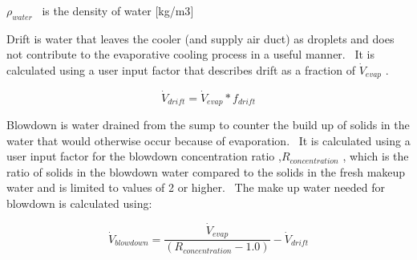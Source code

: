 \({\rho_{water}}\) ~is the density of water {[}kg/m3{]}

Drift is water that leaves the cooler (and supply air duct) as droplets and does not contribute to the evaporative cooling process in a useful manner.~ It is calculated using a user input factor that describes drift as a fraction of \({\dot V_{evap}}\) .

\begin{equation}
{\dot V_{drift}} = {\dot V_{evap}} * {f_{drift}}
\end{equation}

Blowdown is water drained from the sump to counter the build up of solids in the water that would otherwise occur because of evaporation.~ It is calculated using a user input factor for the blowdown concentration ratio ,\({R_{concentration}}\) , which is the ratio of solids in the blowdown water compared to the solids in the fresh makeup water and is limited to values of 2 or higher.~ The make up water needed for blowdown is calculated using:

\begin{equation}
{\dot V_{blowdown}} = \frac{{{{\dot V}_{evap}}}}{{\left( {{R_{concentration}} - 1.0} \right)}} - {\dot V_{drift}}
\end{equation}
